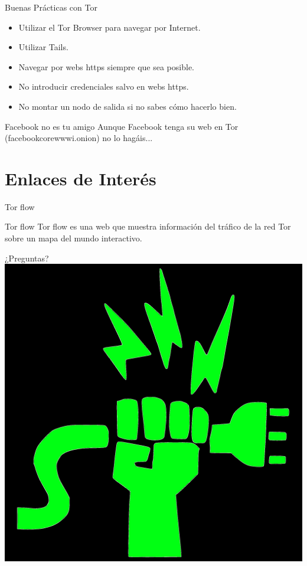 \documentclass[10pt]{beamer}
\begin{document}
\begin{frame}{Buenas Prácticas con Tor}
	\begin{itemize}
		\item<1-> Utilizar el Tor Browser para navegar por Internet.\pause
		\item<2-> Utilizar Tails.\pause
		\item<3-> Navegar por webs https siempre que sea posible.\pause
		\item<4-> No introducir credenciales salvo en webs https.\pause
		\item<5-> No montar un nodo de salida si no sabes cómo hacerlo bien.\pause
	\end{itemize}
	\begin{alertblock}{Facebook no es tu amigo}
		Aunque Facebook tenga su web en Tor (facebookcorewwwi.onion) no lo hagáis...
	\end{alertblock}
\end{frame}

\section{Enlaces de Interés}

\begin{frame}{Tor flow}
	\pause
	\begin{block}{Tor flow}
		Tor flow es una web que muestra información del tráfico de la red Tor sobre un mapa del mundo interactivo.
	\end{block}
	\pause
	
\end{frame}

\begin{frame}[standout]
	\begin{center}
		¿Preguntas?
		\includegraphics[scale=0.15]{./Multimedia/interferencias.jpg}
	\end{center}
\end{frame}
	
\end{document}
